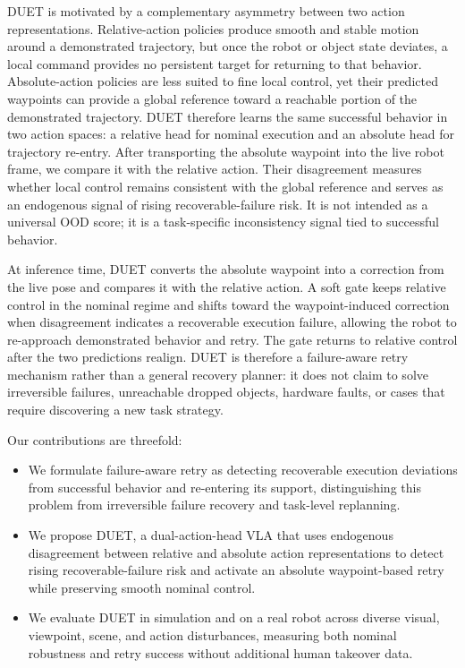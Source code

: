 \documentclass[letterpaper, 10 pt, conference]{ieeeconf}
\begin{document}
DUET is motivated by a complementary asymmetry between two action representations. Relative-action policies produce smooth and stable motion around a demonstrated trajectory, but once the robot or object state deviates, a local command provides no persistent target for returning to that behavior. Absolute-action policies are less suited to fine local control, yet their predicted waypoints can provide a global reference toward a reachable portion of the demonstrated trajectory. DUET therefore learns the same successful behavior in two action spaces: a relative head for nominal execution and an absolute head for trajectory re-entry. After transporting the absolute waypoint into the live robot frame, we compare it with the relative action. Their disagreement measures whether local control remains consistent with the global reference and serves as an endogenous signal of rising recoverable-failure risk. It is not intended as a universal OOD score; it is a task-specific inconsistency signal tied to successful behavior.

At inference time, DUET converts the absolute waypoint into a correction from the live pose and compares it with the relative action. A soft gate keeps relative control in the nominal regime and shifts toward the waypoint-induced correction when disagreement indicates a recoverable execution failure, allowing the robot to re-approach demonstrated behavior and retry. The gate returns to relative control after the two predictions realign. DUET is therefore a failure-aware retry mechanism rather than a general recovery planner: it does not claim to solve irreversible failures, unreachable dropped objects, hardware faults, or cases that require discovering a new task strategy.

Our contributions are threefold:
\begin{itemize}
    \item We formulate failure-aware retry as detecting recoverable execution deviations from successful behavior and re-entering its support, distinguishing this problem from irreversible failure recovery and task-level replanning.
    \item We propose DUET, a dual-action-head VLA that uses endogenous disagreement between relative and absolute action representations to detect rising recoverable-failure risk and activate an absolute waypoint-based retry while preserving smooth nominal control.
    \item We evaluate DUET in simulation and on a real robot across diverse visual, viewpoint, scene, and action disturbances, measuring both nominal robustness and retry success without additional human takeover data.
\end{itemize}
\end{document}

